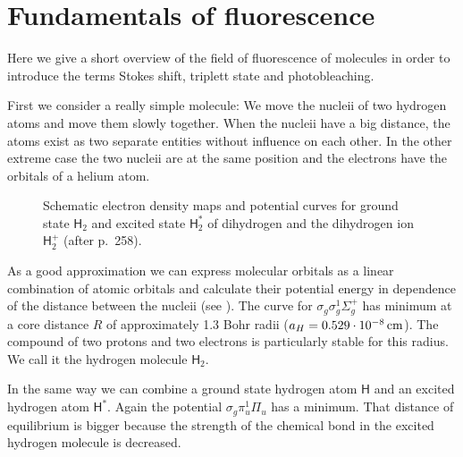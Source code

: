 \newenvironment{fenster}{%
  \begin{addmargin*}[
  5em]{5em}%
    \begin{minipage}{\linewidth}%
    \vspace{1em}
      \rule{\linewidth}{2pt}%
}{%
    \rule[
.25\baselineskip]{\linewidth}{2pt}%
\vspace{1em}
    \end{minipage}%
  \end{addmargin*}%
}
\renewcommand{\H}{\textsf{H}}
\renewcommand{\O}{\textsf{O}}
\section{Fundamentals of fluorescence}
\begin{summary}
  Here we give a short overview of the field of fluorescence of
  molecules in order to introduce the terms Stokes shift, triplett
  state and photobleaching.
\end{summary}
First we consider a really simple molecule: We move the nucleii of two
hydrogen atoms and move them slowly together. When the nucleii have a
big distance, the atoms exist as two separate entities without
influence on each other. In the other extreme case the two nucleii are
at the same position and the electrons have the orbitals of a helium
atom.

\begin{figure}[!hbt]
  \centering
  
  \caption{Schematic electron density maps and potential curves for
    ground state $\H_2$ and excited state $\H_2^*$ of dihydrogen and
    the dihydrogen ion $\H_2^+$ (after \cite{Haken2006} p.~258).}
  \label{fig:flu-potential_my}
\end{figure}
As a good approximation we can express molecular orbitals as a linear
combination of atomic orbitals and calculate their potential energy in
dependence of the distance between the nucleii (see
). The curve for
$\sigma_g\sigma_g^1\Sigma_g^+$ has minimum at a core distance $R$ of
approximately 1.3 Bohr radii ($a_H=\unit[0.529\cdot10^{-8}]{cm}$). The
compound of two protons and two electrons is particularly stable for
this radius. We call it the hydrogen molecule $\H_2$.

In the same way we can combine a ground state hydrogen atom $\H$ and
an excited hydrogen atom $\H^*$. Again the potential
$\sigma_g\pi_u^1\Pi_u$ has a minimum. That distance of equilibrium is
bigger because the strength of the chemical bond in the excited
hydrogen molecule is decreased.


